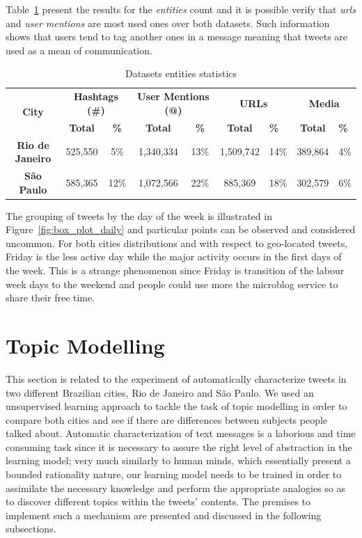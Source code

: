  Table~\ref{tab:entities} present the results for the \emph{entities} count and it is possible verify that \emph{urls} and \emph{user mentions} are most used ones over both datasets. Such information shows that users tend to tag another ones in a message meaning that tweets are used as a mean of communication.

\begin{table}[!htbp]
\small
\centering
\caption{Datasets entities statistics}
\label{tab:entities}
\begin{tabular}{|c|c|c|c|c|c|l|c|l|}
\hline
\multirow{2}{*}{\textbf{City}} & \multicolumn{2}{c|}{\textbf{Hashtags (\#)}} & \multicolumn{2}{c|}{\textbf{User Mentions (@)}} & \multicolumn{2}{c|}{\textbf{URLs}} & \multicolumn{2}{c|}{\textbf{Media}} \\ \cline{2-9} 
 & \textbf{Total} & \textbf{\%} & \textbf{Total} & \textbf{\%} & \textbf{Total} & \textbf{\%} & \textbf{Total} & \textbf{\%} \\ \hline
\textbf{Rio de Janeiro} & 525,550 & 5\% & 1,340,334 & 13\% & 1,509,742 & 14\% & 389,864 & 4\% \\
\textbf{São Paulo} & 585,365 & 12\% & 1,072,566 & 22\% & 885,369 & 18\% & 302,579 & 6\% \\ \hline
\end{tabular}
\end{table}

The grouping of tweets by the day of the week is illustrated in Figure~\ref{fig:box_plot_daily} and particular points can be observed and considered uncommon. For both cities distributions and with respect to geo-located tweets, Friday is the less active day while the major activity occurs in the first days of the week. This is a strange phenomenon since Friday is transition of the labour week days to the weekend and people could use more the microblog service to share their free time.

\section{Topic Modelling}\label{sec:topic_modeling}
This section is related to the experiment of automatically characterize tweets in two different Brazilian cities, Rio de Janeiro and São Paulo. We used an unsupervised learning approach to tackle the task of topic modelling in order to compare both cities and see if there are differences between subjects people talked about. Automatic characterization of text messages is a laborious and time consuming task since it is necessary to assure the right level of abstraction in the learning model; very much similarly to human minds, which essentially present a bounded rationality nature, our learning model needs to be trained in order to assimilate the necessary knowledge and perform the appropriate analogies so as to discover different topics within the tweets' contents. The premises to implement such a mechanism are presented and discussed in the following subsections.

